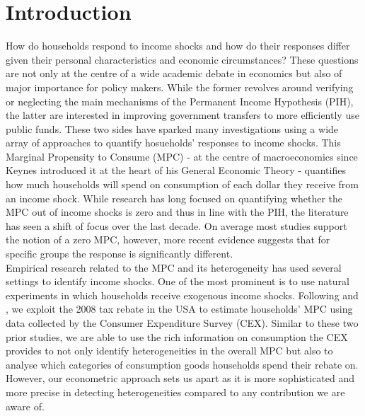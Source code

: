 \section{Introduction} \label{sec:intro}
How do households respond to income shocks and how do their responses differ given their personal characteristics and economic circumstances? These questions are not only at the centre of a wide academic debate in economics but also of major importance for policy makers. While the former revolves around verifying or neglecting the main mechanisms of the Permanent Income Hypothesis (PIH), the latter are interested in improving government transfers to more efficiently use public funds. These two sides have sparked many investigations using a wide array of approaches to quantify hosueholds' responses to income shocks. This Marginal Propensity to Consume (MPC) - at the centre of macroeconomics since Keynes introduced it at the heart of his General Economic Theory - quantifies how much households will spend on consumption of each dollar they receive from an income shock. While research has long focused on quantifying whether the MPC out of income shocks is zero and thus in line with the PIH, the literature has seen a shift of focus over the last decade. On average most studies support the notion of a zero MPC, however, more recent evidence suggests that for specific groups the response is significantly different. \\
Empirical research related to the MPC and its heterogeneity has used several settings to identify income shocks. One of the most prominent is to use natural experiments in which households receive exogenous income shocks. Following \cite{parker_etal_13} and \cite{ms_14}, we exploit the 2008 tax rebate in the USA to estimate households' MPC using data collected by the Consumer Expenditure Survey (CEX). Similar to these two prior studies, we are able to use the rich information on consumption the CEX provides to not only identify heterogeneities in the overall MPC but also to analyse which categories of consumption goods households spend their rebate on. However, our econometric approach sets us apart as it is more sophisticated and more precise in detecting heterogeneities compared to any contribution we are aware of.\\ 

